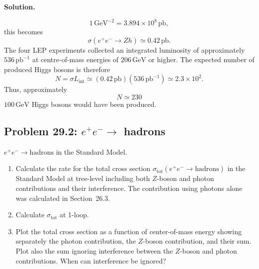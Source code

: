 \documentclass[a4paper,11pt]{article}
\newenvironment{solution}{\par\medskip\noindent\textbf{Solution.}\par\smallskip}{\par\medskip}
\begin{document}
\begin{solution}
\begin{equation}
    1\,\mathrm{GeV}^{-2}
    =3.894\times10^8\,\mathrm{pb},
\end{equation}
this becomes
\begin{equation}
    \sigma(e^+e^-\to Zh)\simeq0.42\,\mathrm{pb}.
\end{equation}
The four LEP experiments collected an integrated luminosity of approximately
$536\,\mathrm{pb}^{-1}$ at centre-of-mass energies of $206\,\mathrm{GeV}$
or higher. The expected number of produced Higgs bosons is therefore
\begin{equation}
    N=\sigma L_{\mathrm{int}}
    \simeq(0.42\,\mathrm{pb})(536\,\mathrm{pb}^{-1})
    \simeq 2.3\times10^2.
\end{equation}
Thus, approximately
\begin{equation}
    \boxed{N\simeq230}
\end{equation}
$100\,\mathrm{GeV}$ Higgs bosons would have been produced.
\end{solution}

\subsection[Problem 29.2: \texorpdfstring{$e^+e^-\to$ hadrons}{electron-positron to hadrons}]{Problem 29.2: \texorpdfstring{$e^+e^-\to$ hadrons}{electron-positron to hadrons}}

$e^+e^-\to\text{hadrons}$ in the Standard Model.

\begin{enumerate}
  \item Calculate the rate for the total cross section
  $\sigma_{\mathrm{tot}}(e^+e^-\to\text{hadrons})$ in the Standard Model at
  tree-level including both $Z$-boson and photon contributions and their
  interference. The contribution using photons alone was calculated in
  Section~26.3.

  \item Calculate $\sigma_{\mathrm{tot}}$ at 1-loop.

  \item Plot the total cross section as a function of center-of-mass energy
  showing separately the photon contribution, the $Z$-boson contribution, and
  their sum. Plot also the sum ignoring interference between the $Z$-boson and
  photon contributions. When can interference be ignored?
\end{enumerate}
\end{document}
